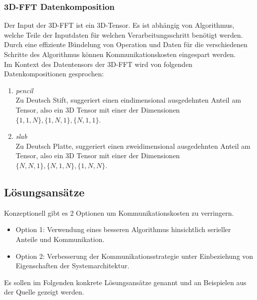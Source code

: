 \subsubsection{3D-FFT Datenkomposition}
Der Input der 3D-FFT ist ein 3D-Tensor. Es ist abhängig von Algorithmus, welche Teile der Inputdaten für welchen Verarbeitungsschritt benötigt werden.
Durch eine effiziente Bündelung von Operation und Daten für die verschiedenen Schritte des Algorithmus können Kommunikationskosten eingespart werden.\\
Im Kontext des Datentensors der 3D-FFT wird von folgenden Datenkompositionen gesprochen:
\begin{enumerate}
	\item \textit{pencil}\\
		Zu Deutsch Stift, suggeriert einen eindimensional ausgedehnten Anteil am Tensor, also ein 3D Tensor mit einer der Dimensionen $\{1,1,N\},\{1,N,1\},\{N,1,1\}$.
	\item \textit{slab}\\
		Zu Deutsch Platte, suggeriert einen zweidimensional ausgedehnten Anteil am Tensor, also ein 3D Tensor mit einer der Dimensionen $\{N,N,1\},\{N,1,N\},\{1,N,N\}$.
\end{enumerate}

\subsection{Lösungsansätze}
Konzeptionell gibt es 2 Optionen um Kommunikationskosten zu verringern.
\begin{itemize}
	\item Option 1: Verwendung eines besseren Algorithmus hinsichtlich serieller Anteile und Kommunikation.
	\item Option 2: Verbesserung der Kommunikationsstrategie unter Einbeziehung von Eigenschaften der Systemarchitektur.
\end{itemize}
Es sollen im Folgenden konkrete Lösungsansätze genannt und an Beispielen aus der Quelle \cite{mainpaper} gezeigt werden.

